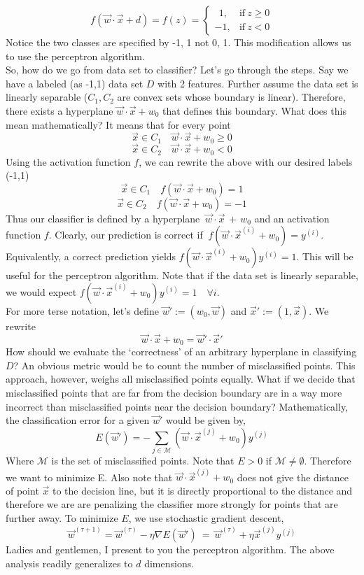 \documentclass[10pt]{article}
\begin{document}
		$$
   			 f(\vec w \cdot \vec x +  d) = f(z) = 
    			\begin{cases}
      				\ \  1, & \text{if} \ z \geq 0 \\
      				-1, & \text{if} \ z < 0 
   			 \end{cases}
  		$$ 
		Notice the two classes are specified by -1, 1 not 0, 1. This modification allows us to use the 
		perceptron algorithm.  \\ 
		
		\noindent So, how do we go from data set to classifier? Let's go through the steps. Say we have a labeled
		(as -1,1) data set $D$ with 2 features. Further assume the data set is linearly separable ($C_1, C_2$ are 
		convex sets whose boundary is linear). Therefore, there exists a hyperplane $\vec w \cdot \vec x + w_0 $ 
		that defines this boundary. What does this mean mathematically? It means that for every point 
		$$\vec x \in C_1 \quad \vec w \cdot \vec x+ w_0 \geq 0$$
		$$\vec x \in C_2 \quad \vec w \cdot \vec x + w_0 < 0$$  
		Using the activation function $f$, we can rewrite the above with our desired labels (-1,1)
		$$\vec x \in C_1 \quad f( \vec w \cdot \vec x + w_0) = 1$$
		$$\vec x \in C_2 \quad f( \vec w \cdot \vec x + w_0) = -1$$
		Thus our classifier is defined by a hyperplane $\ \vec w \cdot \vec x \, + \, w_0$ and an activation function $f$.
		Clearly, our prediction is correct if $\ f(\vec w \cdot \vec x^{(i)} + w_0) = y^{(i)}$. Equivalently, a correct prediction
		yields $f(\vec w \cdot \vec x^{(i)} + w_0) y^{(i)} = 1$. This will be useful for the perceptron algorithm. Note that
		if the data set is linearly separable, we would expect $f(\vec w \cdot \vec x^{(i)}+ w_0) y^{(i)}= 1 \quad \forall i$. 
		 \\
		
		\noindent For more terse notation, let's define $\vec w' := (w_0, \vec w)$ and $\vec x' := (1, \vec x)$. We rewrite 
		$$\vec w \cdot \vec x + w_0 = \vec w' \cdot \vec x'$$
		How should we evaluate the `correctness' of an arbitrary hyperplane in classifying $D$? An obvious metric 
		would be to count the number of misclassified points. This approach, however, weighs all misclassified points 
		equally. What if we decide that misclassified points that are far from the decision boundary are in a way more 
		incorrect than misclassified points near the decision boundary? Mathematically, the classification error for a 
		given $\vec w'$ would be given by,
		$$ E(\vec w') = - \sum_{j \in \mathcal M} (\vec w \cdot \vec x^{(j)} + w_0 )y^{(j)}  $$
		Where $\mathcal M$ is the set of misclassified points. Note that $ E > 0$ if $\mathcal M \not = \emptyset $.
		Therefore we want to minimize E. Also note that $\vec w \cdot \vec x^{(j)} + w_0$ does not give the distance
		of point $\vec x$ to the decision line, but it is directly proportional to the distance and therefore we are 
		are penalizing the classifier more strongly for points that are further away. To minimize $E$, we use 
		stochastic gradient descent, 
		$$ \vec w^{(\tau + 1)} = \vec w^{(\tau)} - \eta \nabla E(\vec w') \ = \ \vec w^{(\tau)} + \eta \vec x^{(j)} y^{(j)} $$
		Ladies and gentlemen, I present to you the perceptron algorithm. The above analysis readily generalizes
		to $d$ dimensions. 	
\end{document}
